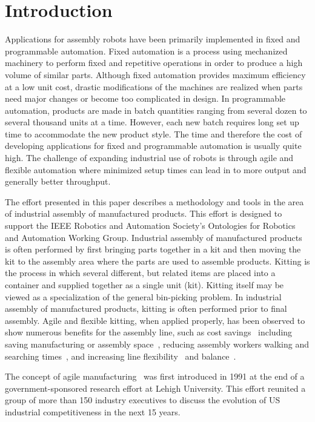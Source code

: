 \section{Introduction}

Applications for assembly robots have been primarily implemented in fixed and programmable automation. Fixed automation is a process using mechanized machinery to perform fixed and repetitive operations in order to produce a high volume of similar parts. Although fixed automation provides maximum efficiency at a low unit cost, drastic modifications of the machines are realized when parts need major changes or become too complicated in design. In programmable automation, products are made in batch quantities ranging from several dozen to several thousand units at a time. However, each new batch requires long set up time to accommodate the new product style. The time and therefore the cost of developing applications for fixed and programmable automation is usually quite high. The challenge of expanding industrial use of robots is through agile and flexible automation where minimized setup times can lead in to more output and generally better throughput.

The effort presented in this paper describes a methodology and tools in the area of industrial assembly of manufactured products. This effort is designed to support the IEEE Robotics and Automation Society's Ontologies for Robotics and Automation Working Group. Industrial assembly of manufactured products is often performed by first bringing parts together in a kit and then moving the kit to the assembly area where the parts are used to assemble products. Kitting is the process in which several different, but related items are placed into a container and supplied together as a single unit (kit). Kitting itself may be viewed as a specialization of the general bin-picking problem. In industrial assembly of manufactured products, kitting is often performed prior to final assembly. Agile and flexible kitting, when applied properly, has been observed to show numerous benefits for the assembly line, such as cost savings~\cite{Carlsson_2008} including saving manufacturing or assembly space~\cite{Medbo2003}, reducing assembly workers walking and searching times~\cite{Schwind1992}, and increasing line flexibility~\cite{Bozer1992} and balance~\cite{Jiao2000}.

The concept of agile manufacturing~\cite{SHERIDAN.1993,Struebing.1995,NAGEL.1991} was first introduced in 1991 at the end of a government-sponsored research effort at Lehigh University. This effort reunited a group of more than 150 industry executives to discuss the evolution of US industrial competitiveness in the next 15 years.

